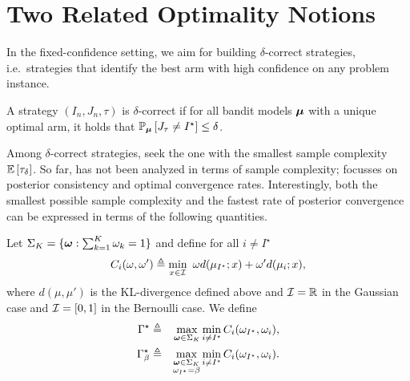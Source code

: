\section{Two Related Optimality Notions}\label{sec:related}

In the fixed-confidence setting, we aim for building $\delta$-correct strategies, i.e.\ strategies that identify the best arm with high confidence on any problem instance. 

\begin{definition} A strategy $(I_n,J_n,\tau)$ is $\delta$-correct if for all bandit models ${\boldsymbol \mu}$ with a unique optimal arm, it holds that $\mathbb{P}_{{\boldsymbol \mu}}\left[J_{\tau} \neq I^\star\right] \leq \delta$. 
\end{definition}

Among $\delta$-correct strategies, seek the one with the smallest sample complexity $\mathbb{E}\left[\tau_\delta\right]$. So far, \TTTS has not been analyzed in terms of sample complexity; \citet{russo2016ttts} focusses on posterior consistency and optimal convergence rates. Interestingly, both the smallest possible sample complexity and the fastest rate of posterior convergence can be expressed in terms of the following quantities.





\begin{definition} Let $\Sigma_K = \{{\boldsymbol \omega} : \sum_{k=1}^K \omega_k = 1\}$ and define for all $i\neq I^\star$
\[
    C_i(\omega,\omega') \triangleq \min_{x\in \mathcal{I}} \ \omega d(\mu_{I^\star};x) + \omega' d(\mu_i;x),
\]
where $d(\mu,\mu')$ is the KL-divergence defined above and $\mathcal{I} = \mathbb{R}$ in the Gaussian case and $\mathcal{I} = [0,1]$ in the Bernoulli case. We define
\begin{eqnarray}
    \Gamma^\star &\triangleq& \max_{{\boldsymbol \omega} \in \Sigma_K}\min_{i\neq I^\star} C_i(\omega_{I^\star},\omega_i),\nonumber\\
    \Gamma_{\beta}^\star &\triangleq& \max_{\substack{{\boldsymbol \omega} \in \Sigma_K\\\omega_{I^\star}=\beta}}\min_{i\neq I^\star} C_i(\omega_{I^\star},\omega_i).\label{def:GammaBeta}\end{eqnarray}
\end{definition}

